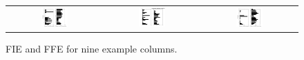 \documentclass[12pt]{article}
\begin{document}
\begin{figure}[!htb]
\begin{tabular}{ccc}
     \includegraphics[width=0.3\textwidth]{fig/ccf/ccf7} & \includegraphics[width=0.3\textwidth]{fig/ccf/ccf8} & \includegraphics[width=0.3\textwidth]{fig/ccf/ccf9} 
 \end{tabular}
 \caption{FIE and FFE for nine example columns. }
 
\end{figure}

 
\end{document}
